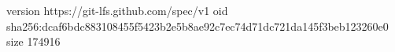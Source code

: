 version https://git-lfs.github.com/spec/v1
oid sha256:dcaf6bdc883108455f5423b2e5b8ae92c7ec74d71dc721da145f3beb123260e0
size 174916
